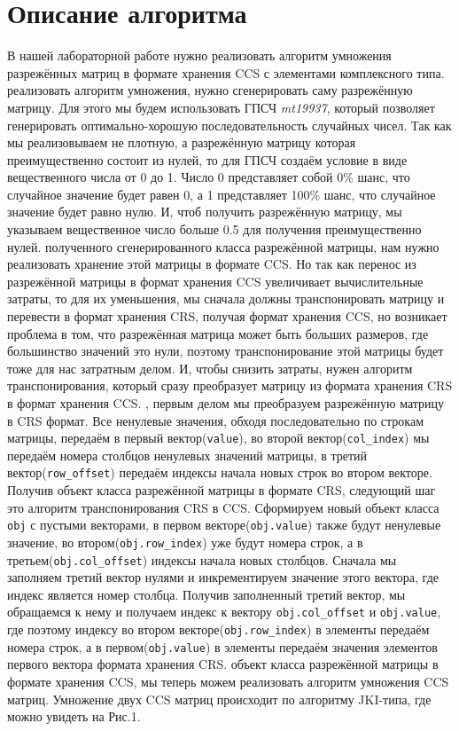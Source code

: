 \documentclass{report}
\begin{document}
	
	\section*{Описание алгоритма}
	В нашей лабораторной работе нужно реализовать алгоритм умножения разрежённых матриц в формате хранения CCS с элементами комплексного типа.
	 реализовать алгоритм умножения, нужно сгенерировать саму разрежённую матрицу. Для этого мы будем использовать ГПСЧ \textit{mt19937}, который позволяет генерировать оптимально-хорошую последовательность случайных чисел. Так как мы реализовываем не плотную, а разрежённую матрицу которая преимущественно состоит из нулей, то для ГПСЧ создаём условие в виде вещественного числа от 0 до 1. Число 0 представляет собой 0\% шанс, что случайное значение будет равен 0, а 1 представляет 100\% шанс, что случайное значение будет равно нулю. И, чтоб получить разрежённую матрицу, мы указываем вещественное число больше 0.5 для получения преимущественно нулей. 
	 полученного сгенерированного класса разрежённой матрицы, нам нужно реализовать хранение этой матрицы в формате CCS. Но так как перенос из разрежённой матрицы в формат хранения CCS увеличивает вычислительные затраты, то для их уменьшения, мы сначала должны транспонировать матрицу и перевести в формат хранения CRS, получая формат хранения CCS, но возникает проблема в том, что разрежённая матрица может быть больших размеров, где большинство значений это нули, поэтому транспонирование этой матрицы будет тоже для нас затратным делом. И, чтобы снизить затраты, нужен алгоритм транспонирования, который сразу преобразует матрицу из формата хранения CRS в формат хранения CCS.
	, первым делом мы преобразуем разрежённую матрицу в CRS формат. Все ненулевые значения, обходя последовательно по строкам матрицы, передаём в первый вектор(\verb|value|), во второй вектор(\verb|col_index|) мы передаём номера столбцов ненулевых значений матрицы, в третий вектор(\verb|row_offset|) передаём индексы начала новых строк во втором векторе. Получив объект класса разрежённой матрицы в формате CRS, следующий шаг это алгоритм транспонирования CRS в CCS. Сформируем новый объект класса \verb|obj| с пустыми векторами, в первом векторе(\verb|obj.value|) также будут ненулевые значение, во втором(\verb|obj.row_index|) уже будут номера строк, а в третьем(\verb|obj.col_offset|) индексы начала новых столбцов. Сначала мы заполняем третий вектор  нулями и инкрементируем значение этого вектора, где индекс является номер столбца. Получив заполненный третий вектор, мы обращаемся к нему и получаем индекс к вектору \verb|obj.col_offset| и \verb|obj.value|, где поэтому индексу во втором векторе(\verb|obj.row_index|) в элементы передаём номера строк, а в первом(\verb|obj.value|) в элементы передаём значения элементов первого вектора формата хранения CRS.
	 объект класса разрежённой матрицы в формате хранения CCS, мы теперь можем реализовать алгоритм умножения CCS матриц. Умножение двух CCS матриц происходит по алгоритму JKI-типа, где можно увидеть на Рис.1.
	
\end{document}
